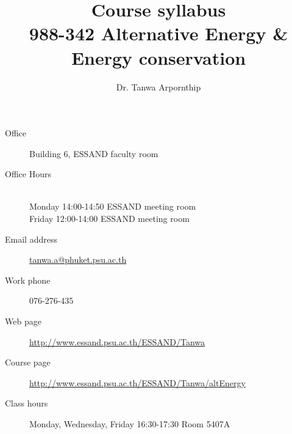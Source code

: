 \documentclass[a4paper,12pt]{article}
\begin{document}

\title{Course syllabus\\ \large 988-342 Alternative Energy \& Energy conservation}
\author{Dr. Tanwa Arpornthip}
\date{}


\maketitle

\noindent\makebox[\linewidth]{\rule{\linewidth}{0.4pt}}
\begin{description}
\item [Office] Building 6, ESSAND faculty room
\item [Office Hours] \hfill \\
    Monday 14:00-14:50 ESSAND meeting room \hfill\\
    Friday 12:00-14:00 ESSAND meeting room
\item [Email address] \href{mailto:tanwa.a@phuket.psu.ac.th}{tanwa.a@phuket.psu.ac.th}
\item [Work phone] 076-276-435
\item [Web page] \href{http://www.essand.psu.ac.th/ESSAND/Tanwa}{http://www.essand.psu.ac.th/ESSAND/Tanwa}
\item [Course page] \href{http://www.essand.psu.ac.th/ESSAND/Tanwa/altEnergy}{http://www.essand.psu.ac.th/ESSAND/Tanwa/altEnergy}
\item [Class hours] Monday, Wednesday, Friday 16:30-17:30 Room 5407A
\end{description}
\noindent\makebox[\linewidth]{\rule{\linewidth}{0.4pt}}
\end{document}
